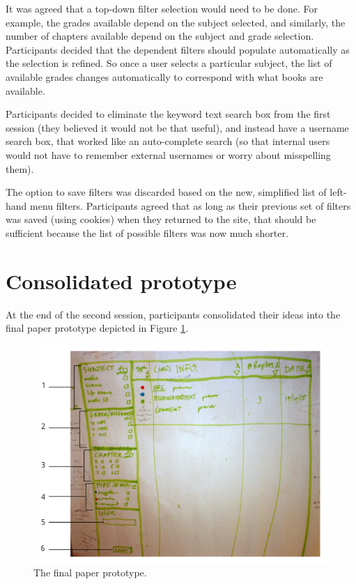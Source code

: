 It was agreed that a top-down filter selection would need to be done. For example, the grades available depend on the subject selected, and similarly, the number of chapters available depend on the subject and grade selection. Participants decided that the dependent filters should populate automatically as the selection is refined. So once a user selects a particular subject, the list of available grades changes automatically to correspond with what books are available. 

Participants decided to eliminate the keyword text search box from the first session (they believed it would not be that useful), and instead have a username search box, that worked like an auto-complete search (so that internal users would not have to remember external usernames or worry about misspelling them). 

The option to save filters was discarded based on the new, simplified list of left-hand menu filters. Participants agreed that as long as their previous set of filters was saved (using cookies) when they returned to the site, that should be sufficient because the list of possible filters was now much shorter. 

\section{Consolidated prototype}
At the end of the second session, participants consolidated their ideas into the final paper prototype depicted in Figure \ref{fig:FinalPP}.
\begin{figure}[h!]
    \centering
     \includegraphics[width=\textwidth]{Figures/forweb/PDFinalLabelssmall.png}
 \caption{The final paper prototype.}
 \label{fig:FinalPP}
\end{figure}

